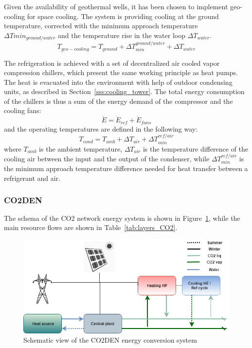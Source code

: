 \documentclass{article}
\begin{document}
Given the availability of geothermal wells, it has been chosen to implement geo-cooling for space cooling. The system is providing cooling at the ground temperature, corrected with the minimum approach temperature $\Delta Tmin_{ground/water}$ and the temperature rise in the water loop $\Delta T_{water}$.
\begin{equation}
T_{geo-cooling} = T_{ground} + \Delta T_{min}^{ground/water} + \Delta T_{water}
\end{equation}

The refrigeration is achieved with a set of decentralized air cooled vapor compression chillers, which present the same working principle as heat pumps. The heat is evacuated into the environment with help of outdoor condensing units, as described in Section~\ref{sss:cooling_tower}.
The total energy consumption of the chillers is thus a sum of the energy demand of the compressor and the cooling fans:
\begin{equation}
\dot{E} = \dot{E}_{ref} + \dot{E}_{fans}
\end{equation}
and the operating temperatures are defined in the following way:
\begin{equation}
    T_{cond} = T_{amb} + \Delta T_{air} + \Delta T_{min}^{ref/air}
\end{equation}
where $T_{amb}$ is the ambient temperature, $\Delta T_{air}$ is the temperature difference of the cooling air between the input and the output of the condenser, while $\Delta T_{min}^{ref/air}$ is the minimum approach temperature difference needed for heat transfer between a refrigerant and air.\\

\subsubsection{CO2DEN}\label{sss:CO2DEN}
The schema of the CO2 network energy system is shown in Figure~\ref{fig:energyschema}, while the main resource flows are shown in Table~\ref{tab:layers_CO2}.

\begin{figure}[tph]
	\centering
	\includegraphics[width=1\linewidth]{Images/energy_schema}
	\caption{Schematic view of the CO2DEN energy conversion system}
	\label{fig:energyschema}
\end{figure}
\end{document}
